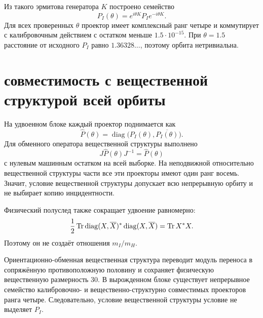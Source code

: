 Из такого эрмитова генератора $K$ построено семейство
\begin{equation}
 P_I(\theta)=e^{i\theta K}P_Ie^{-i\theta K}.
 \label{eq:v8-real-compatible-projector-orbit}
\end{equation}
Для всех проверенных $\theta$ проектор имеет комплексный ранг четыре и
коммутирует с калибровочным действием с остатком меньше $1.5\cdot10^{-15}$.
При $\theta=1.5$ расстояние от исходного $P_I$ равно
$1.36328\ldots$, поэтому орбита нетривиальна.

\section{совместимость с вещественной структурой всей орбиты}

На удвоенном блоке каждый проектор поднимается как
\begin{equation}
 \widehat P(\theta)
 =\operatorname{diag}\bigl(P_I(\theta),\overline{P_I(\theta)}\bigr).
 \label{eq:v8-real-doubled-projector}
\end{equation}
Для обменного оператора вещественной структуры выполнено
\begin{equation}
 J\widehat P(\theta)J^{-1}=\widehat P(\theta)
 \label{eq:v8-real-projector-compatibility}
\end{equation}
с нулевым машинным остатком на всей выборке. На неподвижной относительно вещественной структуры части все
эти проекторы имеют один ранг восемь. Значит, условие вещественной структуры допускает всю
непрерывную орбиту и не выбирает копию инцидентности.

Физический полуслед также сокращает удвоение равномерно:
\begin{equation}
 \frac12\operatorname{Tr}\operatorname{diag}(X,\overline X)^*
                 \operatorname{diag}(X,\overline X)
 =\operatorname{Tr} X^*X.
 \label{eq:v8-real-half-trace-uniform-again}
\end{equation}
Поэтому он не создаёт отношения $m_I/m_H$.

\begin{theorem}
Ориентационно-обменная вещественная структура переводит модуль переноса в
сопряжённую противоположную половину и сохраняет физическую вещественную
размерность 30. В вырожденном блоке существует непрерывное семейство
калибровочно- и вещественно-структурно совместимых проекторов ранга четыре. Следовательно, условие вещественной структуры
условие не выделяет $P_I$.
\end{theorem}

